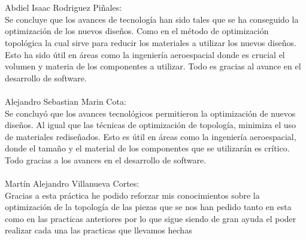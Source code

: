 \documentclass{article}
\begin{document}
\\
\\
Abdiel Isaac Rodriguez Piñales: 
\\Se concluye que los avances de tecnología han sido tales que se ha conseguido la optimización de los nuevos diseños. Como en el método de optimización topológica la cual sirve para reducir los materiales a utilizar los nuevos diseños. Esto ha sido útil en áreas como la ingeniería aeroespacial donde es crucial el volumen y materia de los componentes a utilizar. Todo es gracias al avance en el desarrollo de software.
\\
\\
Alejandro Sebastian Marin Cota: 
\\Se concluyó que los avances tecnológicos permitieron la optimización de nuevos diseños. Al igual que las técnicas de optimización de topología, minimiza el uso de materiales rediseñados. Esto es útil en áreas como la ingeniería aeroespacial, donde el tamaño y el material de los componentes que se utilizarán es crítico. Todo gracias a los avances en el desarrollo de software.
\\
\\
Mart\'{i}n Alejandro Villanueva Cortes:
\\Gracias a esta práctica he podido reforzar mis conocimientos sobre la optimización de la topología de las piezas que se nos han pedido tanto en esta como en las practicas anteriores por lo que sigue siendo de gran ayuda el poder realizar cada una las practicas que llevamos hechas



\end{document}

